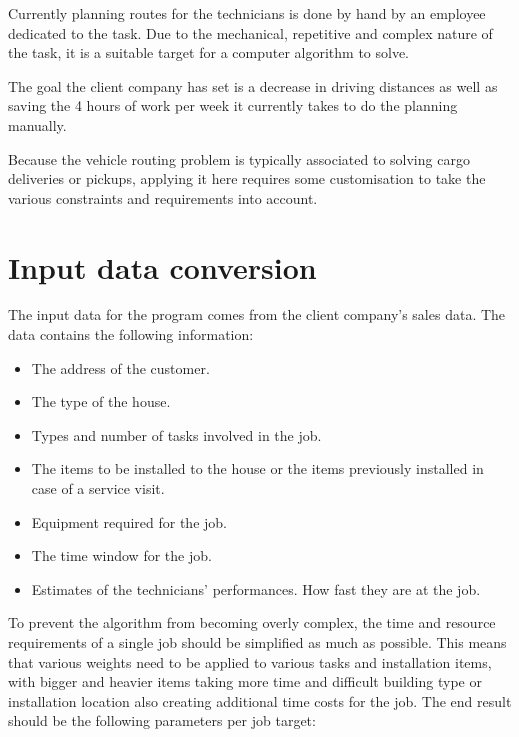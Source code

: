 Currently planning routes for the technicians is done by hand by an employee dedicated to the task. Due to the mechanical, repetitive and complex nature of the task, it is a suitable target for a computer algorithm to solve.

The goal the client company has set is a decrease in driving distances as well as saving the 4 hours of work per week it currently takes to do the planning manually.


Because the vehicle routing problem is typically associated to solving cargo deliveries or pickups, applying it here requires some customisation to take the various constraints and requirements into account. 

\section{Input data conversion}
\label{subsection:dataconversion}

The input data for the program comes from the client company's sales data. The data contains the following information:

\begin{itemize}
\item The address of the customer.
\item The type of the house.
\item Types and number of tasks involved in the job.
\item The items to be installed to the house or the items previously installed in case of a service visit.
\item Equipment required for the job.
\item The time window for the job.
\item Estimates of the technicians' performances. How fast they are at the job.
\end{itemize}

To prevent the algorithm from becoming overly complex, the time and resource requirements of a single job should be simplified as much as possible. This means that various weights need to be applied to various tasks and installation items, with bigger and heavier items taking more time and difficult building type or installation location also creating additional time costs for the job. The end result should be the following parameters per job target:


